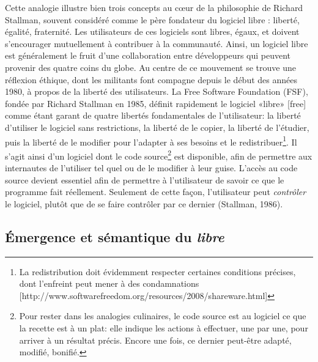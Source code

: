 \documentclass[
  letterpaper,
  DIV=11,
  numbers=noendperiod]{scrreprt}
\begin{document}
Cette analogie illustre bien trois concepts au cœur de la philosophie de
Richard Stallman, souvent considéré comme le père fondateur du logiciel
libre : liberté, égalité, fraternité. Les utilisateurs de ces logiciels
sont libres, égaux, et doivent s'encourager mutuellement à contribuer à
la communauté. Ainsi, un logiciel libre est généralement le fruit d'une
collaboration entre développeurs qui peuvent provenir des quatre coins
du globe. Au centre de ce mouvement se trouve une réflexion éthique,
dont les militants font compagne depuis le début des années 1980, à
propos de la liberté des utilisateurs. La Free Software Foundation
(FSF), fondée par Richard Stallman en 1985, définit rapidement le
logiciel «libre» {[}free{]} comme étant garant de quatre libertés
fondamentales de l'utilisateur: la liberté d'utiliser le logiciel sans
restrictions, la liberté de le copier, la liberté de l'étudier, puis la
liberté de le modifier pour l'adapter à ses besoins et le
redistribuer\footnote{La redistribution doit évidemment respecter
  certaines conditions précises, dont l'enfreint peut mener à des
  condamnations
  {[}http://www.softwarefreedom.org/resources/2008/shareware.html{]}}.
Il s'agit ainsi d'un logiciel dont le code source\footnote{Pour rester
  dans les analogies culinaires, le code source est au logiciel ce que
  la recette est à un plat: elle indique les actions à effectuer, une
  par une, pour arriver à un résultat précis. Encore une fois, ce
  dernier peut-être adapté, modifié, bonifié.} est disponible, afin de
permettre aux internautes de l'utiliser tel quel ou de le modifier à
leur guise. L'accès au code source devient essentiel afin de permettre à
l'utilisateur de savoir ce que le programme fait réellement. Seulement
de cette façon, l'utilisateur peut \emph{contrôler} le logiciel, plutôt
que de se faire contrôler par ce dernier (Stallman, 1986).

\subsection{\texorpdfstring{Émergence et sémantique du
\emph{libre}}{Émergence et sémantique du libre}}\label{uxe9mergence-et-suxe9mantique-du-libre}
\end{document}
